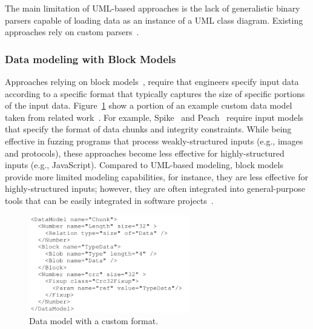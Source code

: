  

The main limitation of UML-based approaches is the lack of generalistic binary parsers capable of loading data as an instance of a UML class diagram. Existing approaches rely on custom parsers~\cite{di2015generating,di2015evolutionary}.

\subsubsection{Data modeling with Block Models}

Approaches relying on block models~\cite{PeachFuzzer,spike,pham2016model}, require that engineers specify input data according to a specific format that typically captures the size of specific portions of the input data. 
Figure~\ref{fig:pit} show a portion of an example custom data model taken from related work~\cite{pham2016model}.
For example, Spike~\cite{spike} and Peach~\cite{PeachFuzzer} require input models that specify the format of data chunks and integrity constraints. 
While being effective in fuzzing programs that process weakly-structured inputs (e.g., images and protocols), these approaches become less effective for highly-structured inputs (e.g., JavaScript).
Compared to UML-based modeling, block models provide more limited modeling capabilities, for instance, they are less effective for highly-structured inputs; however, they are often integrated into general-purpose tools that can be easily integrated in software projects~\cite{PeachFuzzer}.


\begin{figure}[t!]
  \centering
    \includegraphics[width=7cm]{images/PeachPit}
      \caption{Data model with a custom format.}
      \label{fig:pit}
\end{figure}
